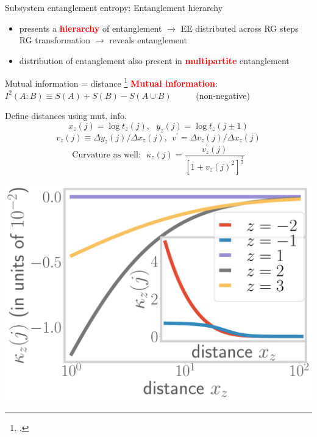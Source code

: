 \documentclass[10pt,aspectratio=169]{beamer}
\newcommand{\focus}[1]{\textcolor{red}{\bf{#1}}}
\begin{document}
\begin{frame}{Subsystem entanglement entropy: Entanglement hierarchy}
\vspace*{\fill}

\begin{itemize}
	\item 
presents a \focus{hierarchy} of entanglement \(\longrightarrow\) EE distributed across RG steps\\
RG transformation \(\longrightarrow\) reveals entanglement

\vspace*{\fill}
\item distribution of entanglement also present in \focus{multipartite} entanglement
\end{itemize}

\end{frame}

\begin{frame}{Mutual information = distance}
\footcite{van2010building,lee2016,anirban_mott_2022,lee2010,lee2014,qi2013,lee2016,anirbanurg1,anirbanurg2,ryu2006,ryu2006aspects,nozaki2012}
\focus{Mutual information}: ~ \(I^2(A:B) \equiv S(A) + S(B) - S(A \cup B)\) ~ ~ ~ (non-negative)\\[10pt]

	\begin{minipage}{0.5\textwidth}
	Define distances using mut. info.
	\[x_z(j) = \log t_z(j),~ ~ ~y_z(j) = \log t_z(j \pm 1)\]
	\[v_z(j) \equiv \Delta y_z(j)/\Delta x_z(j), ~~ v^\prime = \Delta v_z(j)/\Delta x_z(j)\]
	\[\text{Curvature as well:} ~ ~ ~\kappa_{z}(j) = \frac{v^\prime_z(j)}{\left[1 + v_z(j)^2\right]^\frac{3}{2}}\]
	\end{minipage}
	\begin{minipage}{0.49\textwidth}
		\includegraphics[width=\textwidth]{curvature-pos.pdf}
	\end{minipage}
\end{frame}
\end{document}
